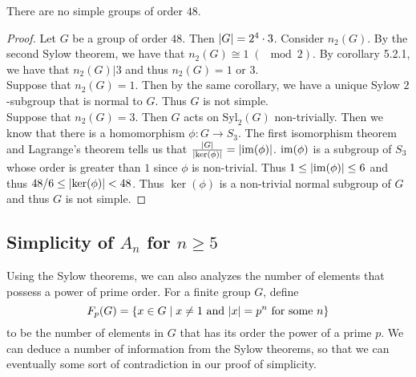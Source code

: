 \documentclass[a4paper]{article}
\begin{document}
\begin{prp}{}{} There are no simple groups of order $48$. 
\begin{proof}
Let $G$ be a group of order $48$. Then $\abs{G}=2^4\cdot 3$. Consider $n_2(G)$. By the second Sylow theorem, we have that $n_2(G)\cong 1\;(\;\bmod 2)$. By corollary 5.2.1, we have that $n_2(G)|3$ and thus $n_2(G)=1$ or $3$. \\
Suppose that $n_2(G)=1$. Then by the same corollary, we have a unique Sylow $2$-subgroup that is normal to $G$. Thus $G$ is not simple. \\
Suppose that $n_2(G)=3$. Then $G$ acts on $\text{Syl}_2(G)$ non-trivially. Then we know that there is a homomorphism $\phi:G\to S_3$. The first isomorphism theorem and Lagrange's theorem tells us that $\frac{\abs{G}}{\abs{\ker(\phi)}}=\abs{\operatorname{im}(\phi)}$. $\operatorname{im}(\phi)$ is a subgroup of $S_3$ whose order is greater than $1$ since $\phi$ is non-trivial. Thus $1\leq\abs{\operatorname{im}(\phi)}\leq 6$ and thus $48/6\leq\abs{\ker(\phi)}<48$. Thus $\ker(\phi)$ is a non-trivial normal subgroup of $G$ and thus $G$ is not simple. 
\end{proof}
\end{prp}

\subsection{Simplicity of $A_n$ for $n\geq 5$}
Using the Sylow theorems, we can also analyzes the number of elements that possess a power of prime order. For a finite group $G$, define $$F_p(G)=\{x\in G\;|\;x\neq 1\text{ and }\abs{x}=p^n\text{ for some }n\}$$ to be the number of elements in $G$ that has its order the power of a prime $p$. We can deduce a number of information from  the Sylow theorems, so that we can eventually some sort of contradiction in our proof of simplicity. 
\end{document}
